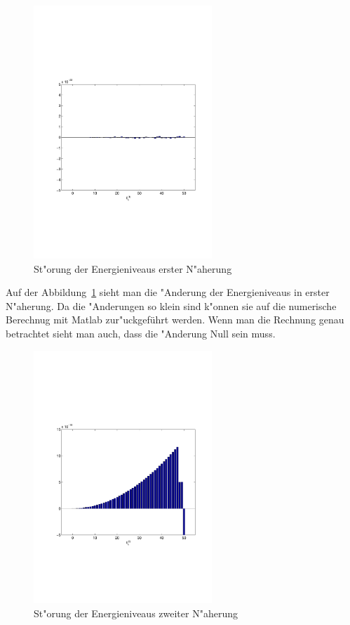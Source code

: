 \begin{refsection}
\begin{figure}[h]	%
\centering
\includegraphics[width=0.6\textwidth]{anharmonisch/images/x3/EK1.pdf}
\caption{St"orung der Energieniveaus erster N"aherung
\label{skript:x3_EK1}}
\end{figure}

Auf der Abbildung~\ref{skript:x3_EK1} sieht man die "Anderung der Energieniveaus in erster N"aherung. Da die "Anderungen so klein sind k"onnen sie auf die numerische Berechnug mit Matlab zur"uckgeführt werden. Wenn man die Rechnung genau betrachtet sieht man auch, dass die "Anderung Null sein muss.

\begin{figure}[h]	%
\centering
\includegraphics[width=0.6\textwidth]{anharmonisch/images/x3/EK2.pdf}
\caption{St"orung der Energieniveaus zweiter N"aherung
\label{skript:x3_EK2}}
\end{figure}


\end{refsection}

